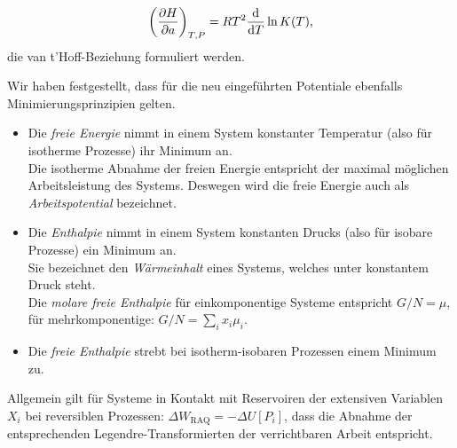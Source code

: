 \begin{align*}
    \left(\frac{\partial H}{\partial a}\right)_{T,P}=RT^2\frac{\mathop{}\!\mathrm{d}}{\mathop{}\!\mathrm{d} T}\ln K(T),
\end{align*}
die van t'Hoff-Beziehung formuliert werden.
\begin{summary}
    Wir haben festgestellt, dass für die neu eingeführten Potentiale ebenfalls Minimierungsprinzipien gelten.
    \begin{itemize}
        \item Die \emph{freie Energie} nimmt in einem System konstanter Temperatur (also für isotherme Prozesse) ihr Minimum an.\\
        Die isotherme Abnahme der freien Energie entspricht der maximal möglichen Arbeitsleistung des Systems. Deswegen wird die freie Energie auch als \emph{Arbeitspotential} bezeichnet.
        \item Die \emph{Enthalpie} nimmt in einem System konstanten Drucks (also für isobare Prozesse) ein Minimum an.\\
        Sie bezeichnet den \emph{Wärmeinhalt} eines Systems, welches unter konstantem Druck steht.\\
        Die \emph{molare freie Enthalpie} für einkomponentige Systeme entspricht $G/N=\mu$, für mehrkomponentige: $G/N=\sum_ix_i\mu_i$.
        \item Die \emph{freie Enthalpie} strebt bei isotherm-isobaren Prozessen einem Minimum zu. 
    \end{itemize}
    Allgemein gilt für Systeme in Kontakt mit Reservoiren der extensiven Variablen $X_i$ bei reversiblen Prozessen: $\Delta W_\mathrm{RAQ}=-\Delta U\left[P_i\right]$, dass die Abnahme der entsprechenden Legendre-Transformierten der verrichtbaren Arbeit entspricht.
    

\end{summary}
